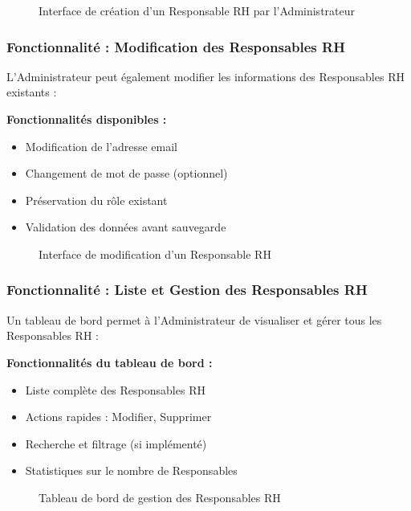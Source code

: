 \documentclass[12pt,a4paper]{article}
\begin{document}
\begin{figure}[H]
    \centering
    \caption{Interface de création d'un Responsable RH par l'Administrateur}
    \label{fig:admin_create_responsable}
\end{figure}

\subsubsection{Fonctionnalité : Modification des Responsables RH}
L'Administrateur peut également modifier les informations des Responsables RH existants :

\textbf{Fonctionnalités disponibles :}
\begin{itemize}
    \item Modification de l'adresse email
    \item Changement de mot de passe (optionnel)
    \item Préservation du rôle existant
    \item Validation des données avant sauvegarde
\end{itemize}

\begin{figure}[H]
    \centering
    \caption{Interface de modification d'un Responsable RH}
    \label{fig:admin_edit_responsable}
\end{figure}

\subsubsection{Fonctionnalité : Liste et Gestion des Responsables RH}
Un tableau de bord permet à l'Administrateur de visualiser et gérer tous les Responsables RH :

\textbf{Fonctionnalités du tableau de bord :}
\begin{itemize}
    \item Liste complète des Responsables RH
    \item Actions rapides : Modifier, Supprimer
    \item Recherche et filtrage (si implémenté)
    \item Statistiques sur le nombre de Responsables
\end{itemize}

\begin{figure}[H]
    \centering
    \caption{Tableau de bord de gestion des Responsables RH}
    \label{fig:admin_liste_responsables}
\end{figure}
\end{document}
